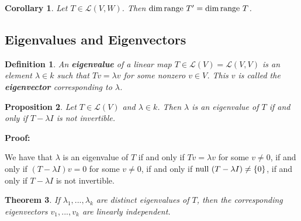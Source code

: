 \documentclass{article}
\theoremstyle{colontheorem}
\newtheorem{theorem}{Theorem}[section]
\newtheorem{proposition}[theorem]{Proposition}
\newtheorem{definition}[theorem]{Definition}
\newtheorem{corollary}{Corollary}[theorem]
\newcommand{\Null}{\textnormal{null }}
\newcommand{\Range}{\textnormal{range }}
\newenvironment{Theorem}
{
	\begin{mdframed}[backgroundcolor=TheoremOrange!10]
	\begin{theorem}
}
{
	\end{theorem}
	\end{mdframed}
	
	\vspace{.15in}
}
\newenvironment{Proposition}
{
	\begin{mdframed}[backgroundcolor=TheoremOrange!10]
	\begin{proposition}
}
{
	\end{proposition}
	\end{mdframed}
	
	\vspace{.15in}
}
\newenvironment{Def}
{
	\begin{mdframed}[backgroundcolor=DefGreen!10]
	\begin{definition}
}
{
	\end{definition}
	\end{mdframed}
	
	\vspace{.15in}
}
\newenvironment{Corollary}
{
	\begin{mdframed}[backgroundcolor=CorollaryBlue!10]
	\begin{corollary}
}
{
	\end{corollary}
	\end{mdframed}
	
	\vspace{.15in}
}
\newenvironment{Proof}
{
	\vspace{-.3in}
	
	\begin{mdframed}[backgroundcolor=ProofPurple!10]
	\textbf{Proof:}%
}
{
	\end{mdframed}
	
	\vspace{.15in}
}
\begin{document}
\begin{Corollary}
	
	Let $T \in \mathcal{L}(V,W)$. Then $\dim \Range T' = \dim \Range T$.
	
\end{Corollary}






\begin{center}
	\pagebreak
	
	\section{Eigenvalues and Eigenvectors}
	
	\vspace{.1in}
\end{center}



\begin{Def}
	
	An \textbf{eigenvalue} of a linear map $T \in \mathcal{L}(V) = \mathcal{L}(V,V)$ is an element $\lambda \in k$ such that $Tv = \lambda v$ for some nonzero $v \in V$. This $v$ is called the \textbf{eigenvector} corresponding to $\lambda$.
	
\end{Def}



\begin{Proposition}
	
	Let $T \in \mathcal{L}(V)$ and $\lambda \in k$. Then $\lambda$ is an eigenvalue of $T$ if and only if $T - \lambda I$ is not invertible.
	
\end{Proposition}



\begin{Proof}
	We have that $\lambda$ is an eigenvalue of $T$ if and only if $Tv = \lambda v$ for some $v \neq 0$, if and only if $(T - \lambda I)v = 0$ for some $v \neq 0$, if and only if $\Null (T - \lambda I) \neq \{0\}$, if and only if $T - \lambda I$ is not invertible.
	
\end{Proof}




\begin{Theorem}
	
	If $\lambda_1, ..., \lambda_k$ are distinct eigenvalues of $T$, then the corresponding eigenvectors $v_1, ..., v_k$ are linearly independent.
	
\end{Theorem}
\end{document}
